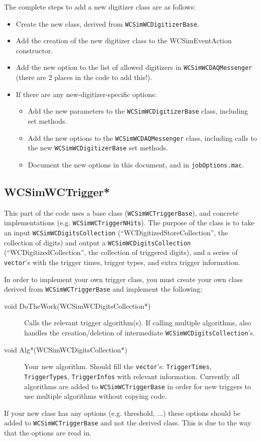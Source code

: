 The complete steps to add a new digitizer class are as follows:
\begin{itemize}
\item Create the new class, derived from \texttt{WCSimWCDigitizerBase}.
\item Add the creation of the new digitizer class to the WCSimEventAction constructor.
\item Add the new option to the list of allowed digitizers in \texttt{WCSimWCDAQMessenger} (there are 2 places in the code to add this!). 
\item If there are any new-digitizer-specific options:
  \begin{itemize}
  \item Add the new parameters to the \texttt{WCSimWCDigitizerBase} class, including set methods.
  \item Add the new options to the \texttt{WCSimWCDAQMessenger} class, including calls to the new \texttt{WCSimWCDigitizerBase} set methods.
  \item Document the new options in this document, and in \texttt{jobOptions.mac}.
  \end{itemize}
\end{itemize}


\subsection{WCSimWCTrigger*}
\label{sec:daq:trigger}

This part of the code uses a base class (\texttt{WCSimWCTriggerBase}), and concrete implementations (e.g. \texttt{WCSimWCTriggerNHits}). The purpose of the class is to take an input \texttt{WCSimWCDigitsCollection} (``WCDigitizedStoreCollection'', the collection of digits) and output a \texttt{WCSimWCDigitsCollection} (``WCDigitizedCollection'', the collection of triggered digits), and a series of \texttt{vector}'s with the trigger times, trigger types, and extra trigger information.

In order to implement your own trigger class, you must create your own class derived from \texttt{WCSimWCTriggerBase} and implement the following:
\begin{description}
\item[void DoTheWork(WCSimWCDigitsCollection*)] Calls the relevant trigger algorithm(s). If calling multiple algorithms, also handles the creation/deletion of intermediate \texttt{WCSimWCDigitsCollection}'s.
\item[void Alg*(WCSimWCDigitsCollection*)] Your new algorithm. Should fill the \texttt{vector}'s: \texttt{TriggerTimes}, \texttt{TriggerTypes}, \texttt{TriggerInfos} with relevant information. Currently all algorithms are added to \texttt{WCSimWCTriggerBase} in order for new triggers to use multiple algorithms without copying code.
\end{description}
If your new class has any options (e.g. threshold, ...) these options should be added to \texttt{WCSimWCTriggerBase} and not the derived class. This is due to the way that the options are read in.

